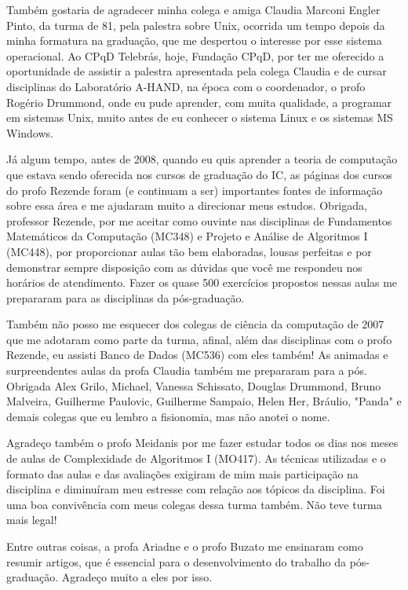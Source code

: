 Também gostaria de agradecer minha colega e amiga Claudia Marconi Engler Pinto, da turma de 81, pela palestra sobre Unix, ocorrida um tempo depois da minha formatura na graduação, que me despertou o interesse por esse sistema operacional. Ao CPqD Telebrás, hoje, Fundação CPqD, por ter me oferecido a oportunidade de assistir a palestra apresentada pela colega Claudia e de cursar disciplinas do Laboratório A-HAND, na época com o coordenador, o profo Rogério Drummond, onde eu pude aprender, com muita qualidade, a programar em sistemas Unix, muito antes de eu conhecer o sistema Linux e os sistemas MS Windows.

Já algum tempo, antes de 2008, quando eu quis aprender a teoria de computação que estava sendo oferecida nos cursos de graduação do IC, as páginas dos cursos do profo Rezende foram (e continuam a ser) importantes fontes de informação sobre essa área e me ajudaram muito a direcionar meus estudos. Obrigada, professor Rezende, por me aceitar como ouvinte nas disciplinas de Fundamentos Matemáticos da Computação (MC348) e Projeto e Análise de Algoritmos I (MC448), por proporcionar aulas tão bem elaboradas, lousas perfeitas e por demonstrar sempre disposição com as dúvidas que você me respondeu nos horários de atendimento. Fazer os quase 500 exercícios propostos nessas aulas me prepararam para as disciplinas da pós-graduação.

Também não posso me esquecer dos colegas de ciência da computação de 2007 que me adotaram como parte da turma, afinal, além das disciplinas com o profo Rezende, eu assisti Banco de Dados (MC536) com eles também! As animadas e surpreendentes aulas da profa Claudia também me prepararam para a pós. Obrigada Alex Grilo, Michael, Vanessa Schissato, Douglas Drummond, Bruno Malveira, Guilherme Paulovic, Guilherme Sampaio, Helen Her, Bráulio, "Panda" e demais colegas que eu lembro a fisionomia, mas não anotei o nome.

Agradeço também o profo Meidanis por me fazer estudar todos os dias nos meses de aulas de Complexidade de Algoritmos I (MO417). As técnicas utilizadas e o formato das aulas e das avaliações exigiram de mim mais participação na disciplina e diminuíram meu estresse com relação aos tópicos da disciplina. Foi uma boa convivência com meus colegas dessa turma também. Não teve turma mais legal!

Entre outras coisas, a profa Ariadne e o profo Buzato me ensinaram como resumir artigos, que é essencial para o desenvolvimento do trabalho da pós-graduação. Agradeço muito a eles por isso.

